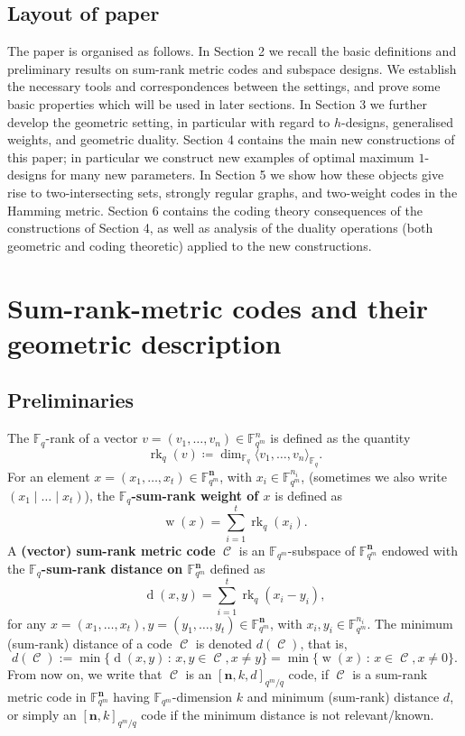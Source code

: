 \documentclass[11pt]{amsart}
\DeclareMathOperator{\C}{\mathcal{C}}
\DeclareMathOperator{\rk}{rk}
\DeclareMathOperator{\dd}{d}
\DeclareMathOperator{\ww}{w}
\theoremstyle{definition}
\newcommand{\F}{{\mathbb F}}
\newcommand{\bfn}{\mathbf {n}}
\newcommand{\fq}{{\mathbb F}_{q}}
\newcommand{\Fq}{{\mathbb F}_{q}}
\newcommand{\Fm}{{\mathbb F}_{q^m}}
\newcommand{\Fmnk}{[\bfn,k]_{q^m/q}}
\newcommand{\Fmnkd}{[\bfn,k,d]_{q^m/q}}
\newcommand{\st}{\,:\,}
\begin{document}
\subsection{Layout of paper}

The paper is organised as follows. In Section 2 we recall the basic definitions and preliminary results on sum-rank metric codes and subspace designs. We establish the necessary tools and correspondences between the settings, and prove some basic properties which will be used in later sections. In Section 3 we further develop the geometric setting, in particular with regard to $h$-designs, generalised weights, and geometric duality. Section 4 contains the main new constructions of this paper; in particular we construct new examples of optimal maximum $1$-designs for many new parameters. In Section 5 we show how these objects give rise to two-intersecting sets, strongly regular graphs, and two-weight codes in the Hamming metric. Section 6 contains the coding theory consequences of the constructions of Section 4, as well as analysis of the duality operations (both geometric and coding theoretic) applied to the new constructions.


\section{Sum-rank-metric codes and their geometric description}

\subsection{Preliminaries}

The $\Fq$-rank of a vector $v=(v_1,\ldots,v_n) \in \F_{q^m}^n$ is defined as the quantity
$$\rk_q(v)\coloneqq\dim_{\fq} \langle v_1,\ldots, v_n\rangle_{\fq}.$$ 
For an element $x=(x_1 , \ldots,  x_t)\in\F_{q^m}^\bfn$, with $x_i\in\F_{q^m}^{n_i}$, (sometimes we also write $(x_1 \mid \ldots \mid x_t)$), the \textbf{$\Fq$-sum-rank weight of $x$} is defined as
$$ \ww(x)=\sum_{i=1}^t \rk_q(x_i).$$
A \textbf{(vector) sum-rank metric code} $\C$ is an $\Fm$-subspace of $\Fm^\bfn$ endowed with the 
\textbf{$\Fq$-sum-rank distance on $\Fm^\bfn$} defined as 
\[
\dd(x,y)=\sum_{i=1}^t \rk_q(x_i-y_i),
\]
for any  $x=(x_1 , \ldots, x_t), y=(y_1, \ldots, y_t) \in \F_{q^m}^\bfn$, with $x_i,y_i \in \F_{q^m}^{n_i}$. The minimum (sum-rank) distance of a code $\C$ is denoted $d(\C)$, that is,
\[
d(\C):=\min\{\dd(x,y) \st x, y \in \C, x\neq y  \}= \min\{\ww(x) \st x \in \C, x\neq 0  \}.
\]
From now on, we write that $\C$ is an $\Fmnkd$ code, if $\C$ is a sum-rank metric code in $\F_{q^m}^{\bfn}$ having $\Fm$-dimension $k$ and minimum (sum-rank) distance $d$, or simply an $\Fmnk$ code if the minimum distance is not relevant/known.
\end{document}
